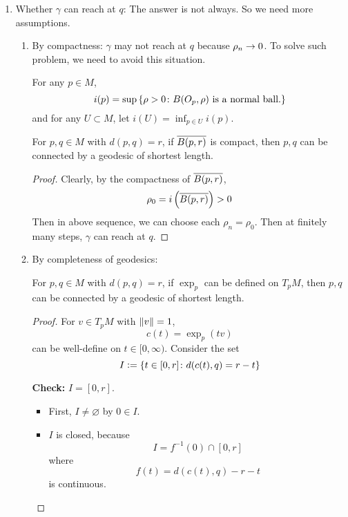 \begin{enumerate}[label=\Roman*.]
	\item Whether $\gamma$ can reach at $q$: The answer is not always. So we need more assumptions.
	\begin{enumerate}[label=(\roman*)]
		\item By compactness: $\gamma$ may not reach at $q$ because $\rho_n \rightarrow 0$. To solve such problem, we need to avoid this situation.
		\begin{defn}
			For any $p \in M$,
			\begin{equation*}
				i(p) = \sup\left\{\rho > 0 \colon B(O_p,\rho) \text{ is a normal ball.}\right\}
			\end{equation*}
			and for any $U \subset M$, let $i(U) = \inf_{p \in U}i(p)$.
		\end{defn}
		\begin{prop}
			For $p,q \in M$ with $d(p,q) = r$, if $\overline{B(p,r)}$ is compact, then $p,q$ can be connected by a geodesic of shortest length.
		\end{prop}
		\begin{proof}
			Clearly, by the compactness of $\overline{B(p,r)}$,
			\begin{equation*}
				\rho_0 = i\left(\overline{B(p,r)}\right) > 0
			\end{equation*}
			Then in above sequence, we can choose each $\rho_n = \rho_0$. Then at finitely many steps, $\gamma$ can reach at $q$.
		\end{proof}

		\item By completeness of geodesics:
		\begin{prop}
			For $p,q \in M$ with $d(p,q) = r$, if $\exp_p$ can be defined on $T_pM$, then $p,q$ can be connected by a geodesic of shortest length.
		\end{prop}
		\begin{proof}
			For $v \in T_pM$ with $\left\lVert v\right\lVert=1$,
			\begin{equation*}
				c(t) = \exp_p(tv)
			\end{equation*}
			can be well-define on $t \in [0,\infty)$. Consider the set
			\begin{equation*}
				I \vcentcolon= \left\{t \in [0,r] \colon d(c(t),q) = r-t\right\}
			\end{equation*}

			\noindent \textbf{Check:} $I = [0,r]$.
			\begin{itemize}
				\item First, $I \neq \varnothing$ by $0 \in I$.

				\item $I$ is closed, because
				\begin{equation*}
					I = f^{-1}(0) \cap [0,r]
				\end{equation*}
				where
				\begin{equation*}
					f(t) = d(c(t),q) - r - t
				\end{equation*}
				is continuous.


\end{itemize}
\end{proof}
\end{enumerate}
\end{enumerate}
